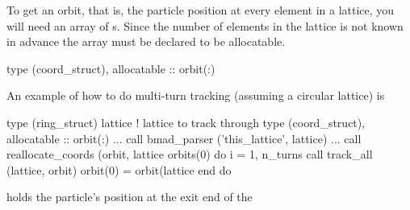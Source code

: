 To get an orbit, that is, the particle position at every element in a
lattice, you will need an array of s. Since the
number of elements in the lattice is not known in advance the array
must be declared to be allocatable.
\begin{example}
  type (coord_struct), allocatable :: orbit(:)
\end{example}
An example of how to do multi-turn tracking (assuming a circular lattice) is
\begin{example}
  type (ring_struct) lattice             ! lattice to track through
  type (coord_struct), allocatable :: orbit(:)
  ...
  call bmad_parser ('this_lattice', lattice)
  ...
  call reallocate_coords (orbit, lattice%
  orbits(0)%
  do i = 1, n_turns
    call track_all (lattice, orbit)
    orbit(0) = orbit(lattice%
  end do
\end{example}
 holds the particle's position at the exit end of the
